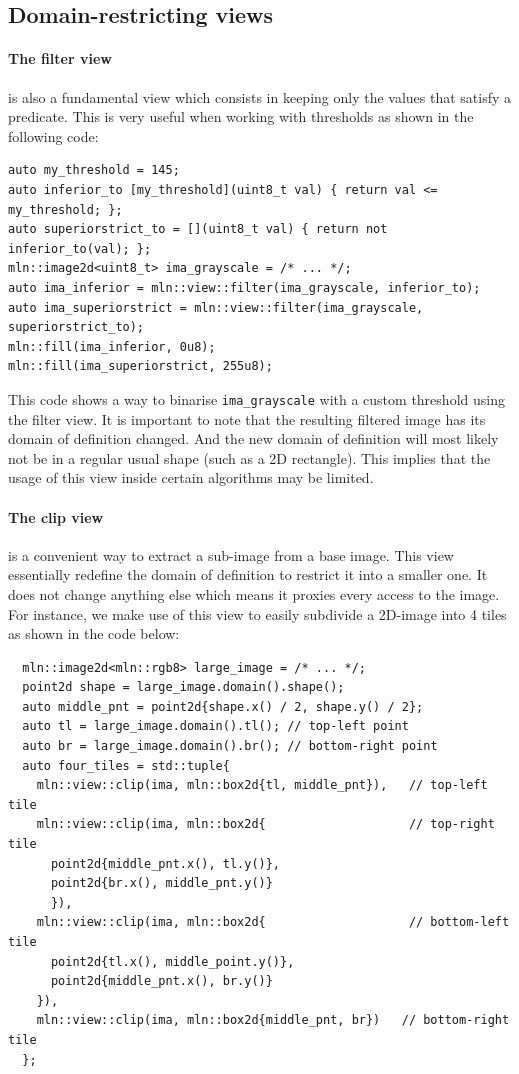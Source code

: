\subsection{Domain-restricting views}

\paragraph{The filter view} is also a fundamental view which consists in keeping only the values that satisfy a
predicate. This is very useful when working with thresholds as shown in the following code:
\begin{verbatim}
auto my_threshold = 145;
auto inferior_to [my_threshold](uint8_t val) { return val <= my_threshold; };
auto superiorstrict_to = [](uint8_t val) { return not inferior_to(val); };
mln::image2d<uint8_t> ima_grayscale = /* ... */;
auto ima_inferior = mln::view::filter(ima_grayscale, inferior_to);
auto ima_superiorstrict = mln::view::filter(ima_grayscale, superiorstrict_to);
mln::fill(ima_inferior, 0u8);
mln::fill(ima_superiorstrict, 255u8);
\end{verbatim}
This code shows a way to binarise \texttt{ima\_grayscale} with a custom threshold using the filter view. It is important
to note that the resulting filtered image has its domain of definition changed. And the new domain of definition will
most likely not be in a regular usual shape (such as a 2D rectangle). This implies that the usage of this view inside
certain algorithms may be limited.

\paragraph{The clip view} is a convenient way to extract a sub-image from a base image. This view essentially redefine
the domain of definition to restrict it into a smaller one. It does not change anything else which means it proxies
every access to the image. For instance, we make use of this view to easily subdivide a 2D-image into 4 tiles as shown in the code below:
\begin{verbatim}
  mln::image2d<mln::rgb8> large_image = /* ... */;
  point2d shape = large_image.domain().shape();
  auto middle_pnt = point2d{shape.x() / 2, shape.y() / 2};
  auto tl = large_image.domain().tl(); // top-left point
  auto br = large_image.domain().br(); // bottom-right point
  auto four_tiles = std::tuple{
    mln::view::clip(ima, mln::box2d{tl, middle_pnt}),   // top-left tile
    mln::view::clip(ima, mln::box2d{                    // top-right tile
      point2d{middle_pnt.x(), tl.y()},
      point2d{br.x(), middle_pnt.y()}
      }),
    mln::view::clip(ima, mln::box2d{                    // bottom-left tile
      point2d{tl.x(), middle_point.y()},
      point2d{middle_pnt.x(), br.y()}
    }),
    mln::view::clip(ima, mln::box2d{middle_pnt, br})   // bottom-right tile
  };
\end{verbatim}

